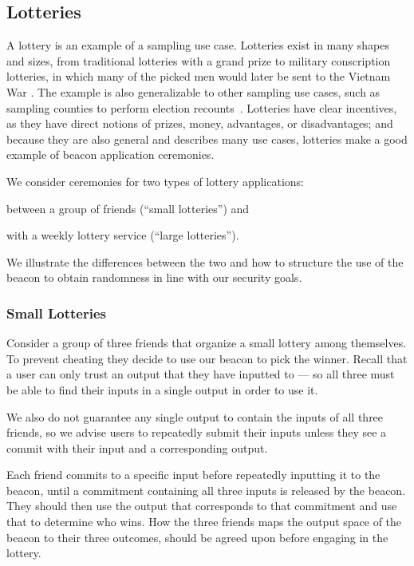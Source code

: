 \subsection{Lotteries}
A lottery is an example of a sampling use case.
Lotteries exist in many shapes and sizes, from traditional lotteries with a grand prize to military conscription lotteries, in which many of the picked men would later be sent to the Vietnam War \cite{starr1997nonrandom}.
The example is also generalizable to other sampling use cases, such as sampling counties to perform election recounts~\cite{bushgore}.
Lotteries have clear incentives, as they have direct notions of prizes, money, advantages, or disadvantages; and because they are also general and describes many use cases, lotteries make a good example of beacon application ceremonies.

We consider ceremonies for two types of lottery applications:
\begin{eletterate*}
\item between a group of friends (\enquote{small lotteries}) and
\item with a weekly lottery service (\enquote{large lotteries}).
\end{eletterate*}
We illustrate the differences between the two and how to structure the use of the beacon to obtain randomness in line with our security goals.

\subsubsection{Small Lotteries}
Consider a group of three friends that organize a small lottery among themselves.
To prevent cheating they decide to use our beacon to pick the winner.
Recall that a user can only trust an output that they have inputted to --- so all three must be able to find their inputs in a single output in order to use it.

We also do not guarantee any single output to contain the inputs of all three friends, so we advise users to repeatedly submit their inputs unless they see a commit with their input and a corresponding output.

Each friend commits to a specific input before repeatedly inputting it to the beacon, until a commitment containing all three inputs is released by the beacon.
They should then use the output that corresponds to that commitment and use that to determine who wins.
How the three friends maps the output space of the beacon to their three outcomes, should be agreed upon before engaging in the lottery.

